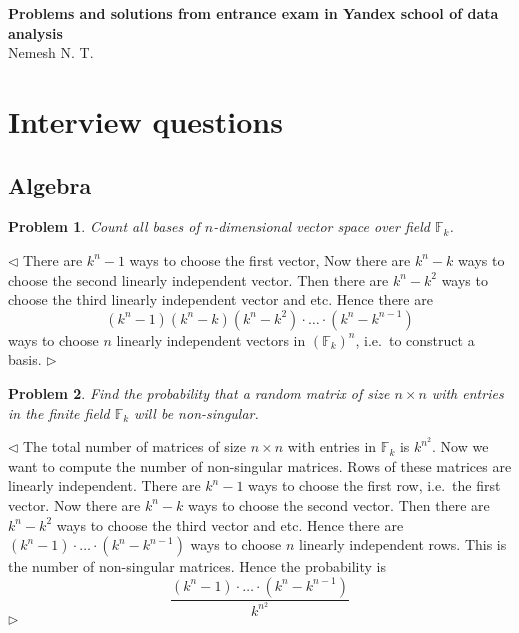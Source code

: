 \documentclass[12pt]{article}
\newtheorem{problem}{Problem}[subsection]
\newenvironment{solution}{\par $\triangleleft$}{$\triangleright$}
\begin{document}
\begin{center}

    \Large \textbf{Problems and solutions from entrance exam in Yandex school of
        data analysis}\\[0.5cm]
    \small {Nemesh N. T.}\\[0.5cm]

\end{center}

\section{Interview questions}

\subsection{Algebra}

\begin{problem} Count all bases of $n$-dimensional vector space over field
$\mathbb{F}_k$.
\end{problem}
\begin{solution} There are $k^n-1$ ways to choose the first vector, Now there
    are $k^n-k$ ways to choose the second linearly independent vector. Then
    there are $k^n-k^2$ ways to choose the third linearly independent vector and
    etc. Hence there are
    $$
        (k^n-1)(k^n-k)(k^n-k^2)\cdot
        \ldots
        \cdot(k^n-k^{n-1})
    $$
    ways to choose $n$ linearly independent vectors in ${(\mathbb{F}_k)}^n$,
    i.e.\ to construct a basis.
\end{solution}

\begin{problem} Find the probability that a random matrix of size $n\times n$
with entries in the finite field $\mathbb{F}_k$ will be non-singular.
\end{problem}
\begin{solution} The total number of matrices of size $n\times n$ with entries
    in $\mathbb{F}_k$ is $k^{n^2}$. Now we want to compute the number of
    non-singular matrices. Rows of these matrices are linearly independent.
    There are $k^n-1$ ways to choose the first row, i.e.\ the first vector. Now
    there are $k^n-k$ ways to choose the second vector. Then there are $k^n-k^2$
    ways to choose the third vector and  etc. Hence there are
    $(k^n-1)\cdot\ldots\cdot(k^n-k^{n-1})$  %
    ways to choose $n$ linearly independent rows. This is the number of
    non-singular matrices. Hence the probability is
    $$
        \frac{(k^n-1)\cdot \ldots\cdot(k^n-k^{n-1})}{k^{n^2}}  %
    $$
\end{solution}
\end{document}
